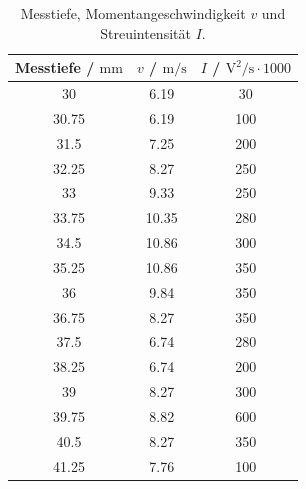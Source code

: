 \documentclass[
  bibliography=totoc,     %
  captions=tableheading,  %
  titlepage=firstiscover, %
]{scrartcl}
\begin{document}
      \begin{table}
        \centering
        \begin{tabular}{c c c}
            \toprule
            {Messtiefe / $\si{\milli\meter}$} & {$v$ / $\si{\meter\per\second}$} &
            {$I$ / $\si{\volt\squared\per\second} \cdot 1000$} \\
            \midrule
            30 & 6.19 & 30 \\
            30.75 &  6.19 & 100 \\
            31.5 & 7.25 & 200 \\
            32.25 & 8.27 & 250 \\
            33 & 9.33 & 250 \\
            33.75 &  10.35 & 280 \\
            34.5 & 10.86 & 300 \\
            35.25 & 10.86 & 350 \\
            36 & 9.84 & 350 \\
            36.75 & 8.27 & 350 \\
            37.5 & 6.74 & 280 \\
            38.25 & 6.74 & 200 \\
            39 & 8.27 & 300 \\
            39.75 & 8.82 & 600 \\
            40.5 & 8.27 & 350 \\
            41.25 & 7.76 & 100 \\
            \bottomrule
        \end{tabular}
        \caption{Messtiefe, Momentangeschwindigkeit $v$ und Streuintensität $I$.}
        \label{tab:5}
      \end{table}
\end{document}
